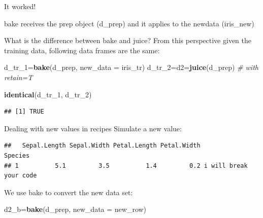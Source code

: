 \documentclass[]{article}
\newenvironment{Shaded}{\begin{snugshade}}{\end{snugshade}}
\newcommand{\KeywordTok}[1]{\textcolor[rgb]{0.13,0.29,0.53}{\textbf{#1}}}
\newcommand{\DataTypeTok}[1]{\textcolor[rgb]{0.13,0.29,0.53}{#1}}
\newcommand{\DecValTok}[1]{\textcolor[rgb]{0.00,0.00,0.81}{#1}}
\newcommand{\StringTok}[1]{\textcolor[rgb]{0.31,0.60,0.02}{#1}}
\newcommand{\CommentTok}[1]{\textcolor[rgb]{0.56,0.35,0.01}{\textit{#1}}}
\newcommand{\OperatorTok}[1]{\textcolor[rgb]{0.81,0.36,0.00}{\textbf{#1}}}
\newcommand{\NormalTok}[1]{#1}
\begin{document}
It worked!

bake receives the prep object (d\_prep) and it applies to the newdata
(iris\_new)

What is the difference between bake and juice? From this perspective
given the training data, following data frames are the same:

\begin{Shaded}
\begin{Highlighting}[]
\NormalTok{d_tr_}\DecValTok{1}\NormalTok{=}\KeywordTok{bake}\NormalTok{(d_prep, }\DataTypeTok{new_data =}\NormalTok{ iris_tr)}
\NormalTok{d_tr_}\DecValTok{2}\NormalTok{=d2=}\KeywordTok{juice}\NormalTok{(d_prep) }\CommentTok{# with retain=T}

\KeywordTok{identical}\NormalTok{(d_tr_}\DecValTok{1}\NormalTok{, d_tr_}\DecValTok{2}\NormalTok{)}
\end{Highlighting}
\end{Shaded}

\begin{verbatim}
## [1] TRUE
\end{verbatim}

Dealing with new values in recipes Simulate a new value:

\begin{Shaded}
\end{Shaded}

\begin{verbatim}
##   Sepal.Length Sepal.Width Petal.Length Petal.Width                Species
## 1          5.1         3.5          1.4         0.2 i will break your code
\end{verbatim}

We use bake to convert the new data set:

\begin{Shaded}
\begin{Highlighting}[]
\NormalTok{d2_b=}\KeywordTok{bake}\NormalTok{(d_prep, }\DataTypeTok{new_data =}\NormalTok{ new_row)}
\end{Highlighting}
\end{Shaded}
\end{document}
